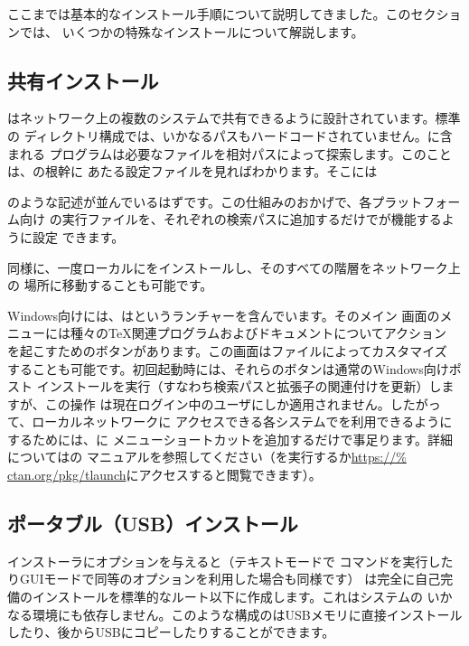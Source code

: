 \documentclass[uplatex,dvipdfmx,12pt,tombow]{jsarticle}
\begin{document}
ここまでは基本的なインストール手順について説明してきました。このセクションでは、
いくつかの特殊なインストールについて解説します。

\subsection{共有インストール}
\label{sec:sharedinstall}

\TL はネットワーク上の複数のシステムで共有できるように設計されています。標準の
ディレクトリ構成では、いかなるパスもハードコードされていません。\TL に含まれる
プログラムは必要なファイルを相対パスによって探索します。このことは、\TL の根幹に
あたる設定ファイルを見ればわかります。そこには
%
%
のような記述が並んでいるはずです。この仕組みのおかげで、各プラットフォーム向け
の実行ファイルを、それぞれの検索パスに追加するだけで\TL が機能するように設定
できます。

同様に、一度ローカルに\TL をインストールし、そのすべての階層をネットワーク上の
場所に移動することも可能です。

Windows向けには、\TL はというランチャーを含んでいます。そのメイン
画面のメニューには種々の\TeX 関連プログラムおよびドキュメントについてアクション
を起こすためのボタンがあります。この画面はファイルによってカスタマイズ
することも可能です。初回起動時には、それらのボタンは通常のWindows向けポスト
インストールを実行（すなわち検索パスと拡張子の関連付けを更新）しますが、この操作
は現在ログイン中のユーザにしか適用されません。したがって、ローカルネットワークに
アクセスできる各システムで\TL を利用できるようにするためには、に
メニューショートカットを追加するだけで事足ります。詳細についてはの
マニュアルを参照してください（を実行するか\url{https://%
ctan.org/pkg/tlaunch}にアクセスすると閲覧できます）。

\subsection{ポータブル（USB）インストール}
\label{sec:portable-tl}

\TL インストーラにオプションを与えると（テキストモードで%
コマンドを実行したりGUIモードで同等のオプションを利用した場合も同様です）\TL
は完全に自己完備のインストールを標準的なルート以下に作成します。これはシステムの
いかなる環境にも依存しません。このような構成の\TL はUSBメモリに直接インストール
したり、後からUSBにコピーしたりすることができます。
\end{document}
